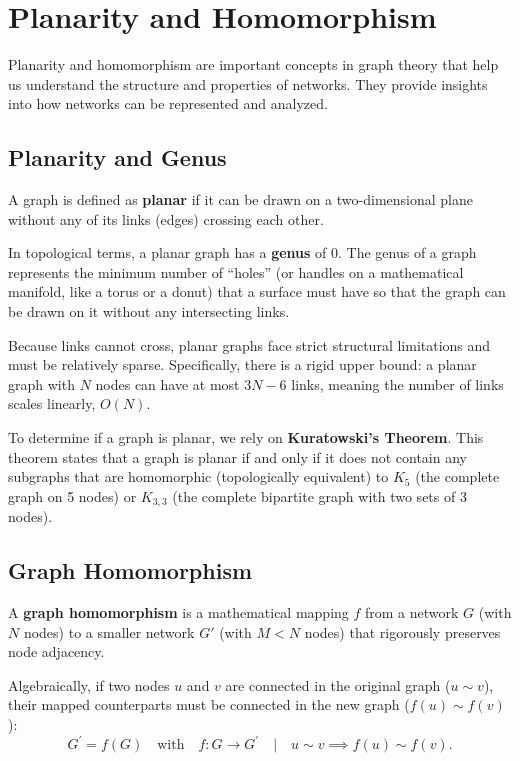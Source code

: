 \section{Planarity and Homomorphism}

Planarity and homomorphism are important concepts in graph theory that help us understand the structure and properties of networks. They provide insights into how networks can be represented and analyzed.

\subsection{Planarity and Genus}
A graph is defined as \textbf{planar} if it can be drawn on a two-dimensional plane without any of its links (edges) crossing each other.

In topological terms, a planar graph has a \textbf{genus} of 0. The genus of a graph represents the minimum number of ``holes'' (or handles on a mathematical manifold, like a torus or a donut) that a surface must have so that the graph can be drawn on it without any intersecting links.

Because links cannot cross, planar graphs face strict structural limitations and must be relatively sparse. Specifically, there is a rigid upper bound: a planar graph with $N$ nodes can have at most $3N-6$ links, meaning the number of links scales linearly, $O(N)$.

To determine if a graph is planar, we rely on \textbf{Kuratowski's Theorem}. This theorem states that a graph is planar if and only if it does not contain any subgraphs that are homomorphic (topologically equivalent) to $K_5$ (the complete graph on 5 nodes) or $K_{3,3}$ (the complete bipartite graph with two sets of 3 nodes).

\subsection{Graph Homomorphism}
A \textbf{graph homomorphism} is a mathematical mapping $f$ from a network $G$ (with $N$ nodes) to a smaller network $G'$ (with $M < N$ nodes) that rigorously preserves node adjacency.

Algebraically, if two nodes $u$ and $v$ are connected in the original graph ($u \sim v$), their mapped counterparts must be connected in the new graph ($f(u) \sim f(v)$):
\[
    G^{\prime} = f(G) \quad \text{with} \quad f: G \rightarrow G^{\prime} \quad \big| \quad u \sim v \implies f(u) \sim f(v).
\]

